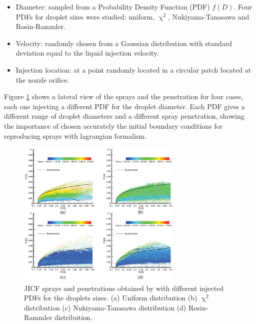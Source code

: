 \begin{itemize}
	
	\item Diameter: sampled from a Probability Density Function (PDF) $f \left(  D \right)$. Four PDFs for droplet sizes were studied: uniform, $\upchi^2$, Nukiyama-Tanasawa and Rosin-Rammler.

	\item Velocity: randomly chosen from a Gaussian distribution with standard deviation equal to the liquid injection velocity.
	
	\item Injection location: at a point randomly located in a circular patch located at the nozzle orifice.

\end{itemize}

Figure \ref{fig:fan_2018_jets_penetration} shows a lateral view of the sprays and the penetration for four cases, each one injecting a different PDF for the droplet diameter. Each PDF gives a different range of droplet diameters and a different spray penetration, showing the importance of chosen accurately the initial boundary conditions for reproducing sprays with lagrangian formalism.

\begin{figure}[ht]
    \centering
    \includegraphics[width=0.7\textwidth]{./part1_numerical_approaches/figures_ch3/fan_2018_jets_penetration}
       \centering
    \caption{JICF sprays and penetrations obtained by  with different injected PDFs for the droplets sizes. (a) Uniform distribution (b) $\upchi^2$ distribution (c) Nukiyama-Tanasawa distribution (d) Rosin-Rammler distribution.}
    \label{fig:fan_2018_jets_penetration}
\end{figure}



